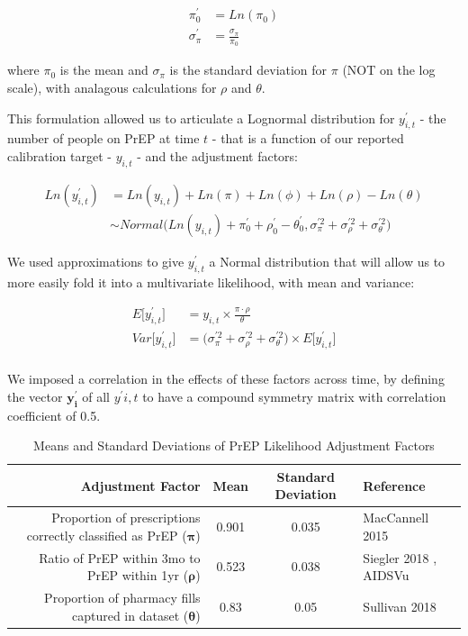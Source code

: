 \documentclass{article}
\begin{document}
\begin{align*}
	\pi^\prime_0 &= Ln(\pi_0) \\
	\sigma^{\prime}_\pi &= \frac{\sigma_\pi}{\pi_0}
\end{align*}

where $\pi_0$ is the mean and $\sigma_\pi$ is the standard deviation for $\pi$ (NOT on the log scale), with analagous calculations for $\rho$ and $\theta$.

This formulation allowed us to articulate a Lognormal distribution for $y^\prime_{i,t}$ - the number of people on PrEP at time $t$ - that is a function of our reported calibration target - $y_{i,t}$ - and the adjustment factors:

\begin{align}
	Ln(y^\prime_{i,t}) &= Ln(y_{i,t}) + Ln(\pi) + Ln(\phi) + Ln(\rho) - Ln(\theta) \\
	&\sim Normal \Big( Ln(y_{i,t}) + \pi^\prime_0 + \rho^\prime_0 - \theta^\prime_0,  \sigma^{\prime 2}_\pi + \sigma^{\prime 2}_\rho + \sigma^{\prime 2}_\theta \Big)
\end{align} 

We used approximations to give $y^\prime_{i,t}$ a Normal distribution that will allow us to more easily fold it into a multivariate likelihood, with mean and variance:

\begin{align*}
	E \big[y^\prime_{i,t} \big] &= y_{i,t} \times \frac{\pi \cdot \rho}{\theta} \\
	Var \big[y^\prime_{i,t} \big] &= \big( \sigma^{\prime 2}_\pi + \sigma^{\prime 2}_\rho + \sigma^{\prime 2}_\theta \big) \times E \big[y^\prime_{i,t} \big] \\
\end{align*}

We imposed a correlation in the effects of these factors across time, by defining the vector $\bm{y^\prime_i}$ of all $y^\prime{i,t}$ to have a compound symmetry matrix with correlation coefficient of 0.5.

\begin{table}[h!]
		\caption{Means and Standard Deviations of PrEP Likelihood Adjustment Factors}
		\label{prep_factors}
		\begin{tabular}{r|c|c|l} 
			\textbf{Adjustment Factor} & \textbf{Mean} & \textbf{Standard Deviation} & \textbf{Reference}\\
			\hline
			Proportion of prescriptions correctly classified as PrEP ($\mathbf{\pi}$) & 0.901 & 0.035 & MacCannell 2015 \cite{maccannell2015} \\
			\hline
			Ratio of PrEP within 3mo to PrEP within 1yr ($\mathbf{\rho}$) & 0.523 & 0.038 & Siegler 2018 \cite{siegler2018}, AIDSVu \cite{aidsvu_prep} \\
			\hline
			Proportion of pharmacy fills captured in dataset ($\mathbf{\theta}$) & 0.83 & 0.05 & Sullivan 2018\cite{sullivan2018} \\
		\end{tabular}
\end{table}
\end{document}
